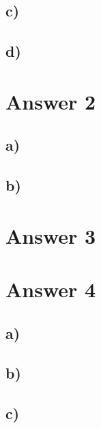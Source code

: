 \documentclass[12pt]{article}
\begin{document}
\subsection*{c)} 

\subsection*{d)} 


\section*{Answer 2}

\subsection*{a)} 

\subsection*{b)} 


\section*{Answer 3}


\section*{Answer 4}

\subsection*{a)} 

\subsection*{b)} 

\subsection*{c)} 
\end{document}
